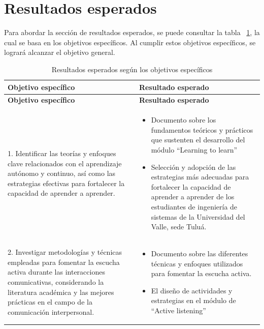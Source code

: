 \section{Resultados esperados}
Para abordar la sección de resultados esperados, se puede consultar la tabla ~\ref{tab:resultados}, la cual se basa en los objetivos específicos. Al cumplir estos objetivos específicos, se logrará alcanzar el objetivo general.

\begingroup
\setlength{\tabcolsep}{10pt} %
\setlength{\extrarowheight}{3pt} 
\renewcommand{\arraystretch}{1.25}

\begin{longtable}{|p{8cm}|p{8cm}|}
\caption{Resultados esperados según los objetivos específicos}
\label{tab:resultados} \\
\hline
\textbf{Objetivo específico} & \textbf{Resultado esperado} \\
\hline
\endfirsthead

\hline
\textbf{Objetivo específico} & \textbf{Resultado esperado} \\
\hline
\endhead

\endfoot

\hline \hline
\endlastfoot

1. Identificar las teorías y enfoques clave relacionados con el aprendizaje autónomo y continuo, así como las estrategias efectivas para fortalecer la capacidad de aprender a aprender. 
& \begin{itemize}[leftmargin=*, topsep=0pt, partopsep=0pt, parsep=0pt, itemsep=0.4\baselineskip]
     \item Documento sobre los fundamentos teóricos y prácticos que sustenten el desarrollo del módulo “Learning to learn”
    \item Selección y adopción de las estrategias más adecuadas para fortalecer la capacidad de aprender a aprender de los estudiantes de ingeniería de sistemas de la Universidad del Valle, sede Tuluá.
\end{itemize}
\\ \hline

2. Investigar metodologías y técnicas empleadas para fomentar la escucha activa durante las interacciones comunicativas, considerando la literatura académica y las mejores prácticas en el campo de la comunicación interpersonal.
& \begin{itemize}[leftmargin=*, topsep=0pt, partopsep=0pt, parsep=0pt, itemsep=0.4\baselineskip]
     \item Documento sobre las diferentes técnicas y enfoques utilizados para fomentar la escucha activa.
    \item El diseño de actividades y estrategias en el módulo de “Active listening”
\end{itemize}
\\ \hline


\end{longtable}
